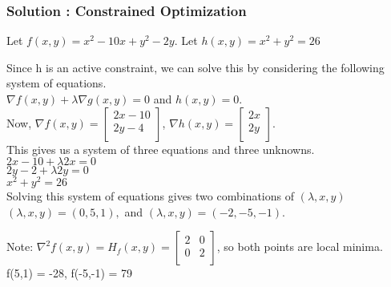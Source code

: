 \documentclass{beamer}
\begin{document}
\begin{frame}
\frametitle{Solution : Constrained Optimization}
Let $f(x,y) = x^2-10x + y^2 - 2y$. Let $h(x,y) = x^2+y^2 = 26$
\begin{solution}
Since h is an active constraint, we can solve this by considering the following system of equations.\\
\quad $\nabla f(x,y) + \lambda \nabla g(x,y) = 0$ and  $h(x,y) = 0$. \\
Now, 
$\nabla f(x,y) = 
\begin{bmatrix}
2x - 10  \\
2y - 4 \\
\end{bmatrix}$, 
$\nabla h(x,y) = 
\begin{bmatrix}
2x \\
2y \\
\end{bmatrix}$. \\
This gives us a system of three equations and three unknowns.\\
\quad $2x - 10 + \lambda 2 x = 0$ \\
\quad $2y - 2  + \lambda 2 y = 0$ \\
\quad $x^2+y^2 = 26$ \\
Solving this system of equations gives two combinations of $(\lambda, x, y)$\\
$(\lambda, x, y)  =  (0,5,1),$ and $(\lambda, x, y) = (-2,-5,-1)$.

Note: $\nabla^2 f(x,y) = H_f(x,y) = 
\begin{bmatrix}
2 & 0 \\
0 & 2 \\
\end{bmatrix}$, so both points are local minima. f(5,1) = -28, f(-5,-1) = 79 
\end{solution}
\end{frame}
\end{document}
